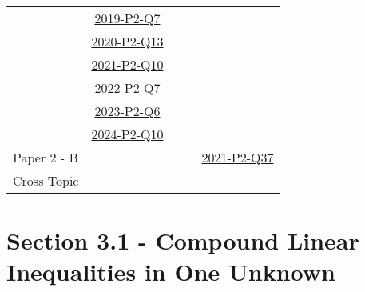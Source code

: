\documentclass[12pt, a4paper]{article}
\begin{document}
\begin{absolutelynopagebreak}
\begin{center}
\begin{tabular}{|l|c|c|c|c|}
& \hyperref[DSE2019-CoreP2-Q07]{2019-P2-Q7} &  &  &  \\
& \hyperref[DSE2020-CoreP2-Q13]{2020-P2-Q13} &  &  &  \\
& \hyperref[DSE2021-CoreP2-Q10]{2021-P2-Q10} &  &  &  \\
& \hyperref[DSE2022-CoreP2-Q07]{2022-P2-Q7} &  &  &  \\
& \hyperref[DSE2023-CoreP2-Q06]{2023-P2-Q6} &  &  &  \\
& \hyperref[DSE2024-CoreP2-Q10]{2024-P2-Q10} &  &  &  \\
\hline
Paper 2 - B&  &  &  & \hyperref[DSE2021-CoreP2-Q37]{2021-P2-Q37} \\
\hline
\hline
Cross Topic&  &  &  &  \\
\hline
\end{tabular}
\end{center}
\end{absolutelynopagebreak}




\section*{Section 3.1 - Compound Linear Inequalities in One Unknown}\label{section:5-3-1}
\end{document}
